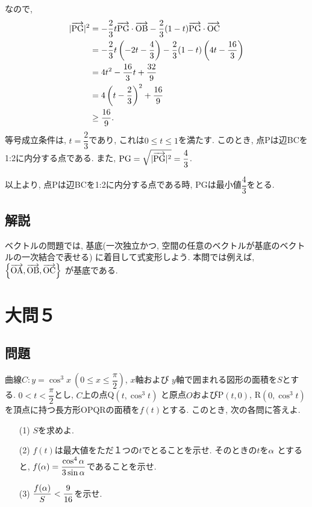 \documentclass[dvipdfmx,a4paper]{jsarticle}
\begin{document}
\begin{itemize}
        なので, 
        \begin{align*}
            |\overrightarrow{\mathrm{PG}}|^2 
            &= - \dfrac{2}{3}t \overrightarrow{\mathrm{PG}} \cdot \overrightarrow{\mathrm{OB}} - \dfrac{2}{3} (1-t) \overrightarrow{\mathrm{PG}} \cdot \overrightarrow{\mathrm{OC}} \\
            &= - \dfrac{2}{3}t \left(-2t - \dfrac{4}{3}\right) - \dfrac{2}{3} (1-t) \left(4t - \dfrac{16}{3}\right) \\
            &= 4t^2 - \dfrac{16}{3}t + \dfrac{32}{9} \\
            &= 4 \left(t- \dfrac{2}{3}\right)^2 + \dfrac{16}{9} \\
            &\geq \dfrac{16}{9}. 
        \end{align*}
        等号成立条件は, $t=\dfrac{2}{3}$であり, これは$0\leq t\leq 1$を満たす. 
        このとき, 点Pは辺BCを1:2に内分する点である. また, $\mathrm{PG} = \sqrt{|\overrightarrow{\mathrm{PG}}|^2 } = \dfrac{4}{3}$. 

        以上より, 点Pは辺BCを1:2に内分する点である時, PGは最小値$\dfrac{4}{3}$をとる. 

    \end{itemize}
    
    \subsection{解説}
    ベクトルの問題では, 基底(一次独立かつ, 空間の任意のベクトルが基底のベクトルの一次結合で表せる)
    に着目して式変形しよう. 本問では例えば, $\left\{\overrightarrow{\mathrm{OA}}, \overrightarrow{\mathrm{OB}}, \overrightarrow{\mathrm{OC}}\right\}$
    が基底である. 
    
    \section{大問５}
    \subsection{問題}
    曲線$C: y=\cos ^3 x \ \left(0 \leq x \leq \dfrac{\pi}{2}\right)$, $x$軸および
    $y$軸で囲まれる図形の面積を$S$とする. $0<t<\dfrac{\pi}{2}$とし, $C$上の点Q$(t, \cos ^3 t)$
    と原点$O$およびP$(t,0)$, R$(0, \cos ^3 t)$を頂点に持つ長方形OPQRの面積を$f(t)$とする. 
    このとき, 次の各問に答えよ. 
    \begin{itemize}
        \item [(1)] $S$を求めよ. 
        \item [(2)] $f(t)$は最大値をただ１つの$t$でとることを示せ. そのときの$t$を$\alpha$
        とすると, $f(\alpha) = \dfrac{\cos ^4 \alpha}{3 \sin \alpha}$であることを示せ. 
        \item [(3)] $\dfrac{f(\alpha)}{S} < \dfrac{9}{16}$を示せ. 
    \end{itemize}
\end{document}
